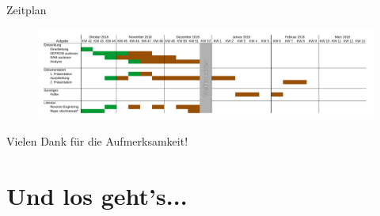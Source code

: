 \documentclass[
  de, %
  inputenc=utf8,
]{tuhhslides}
\begin{document}
\begin{frame}{Zeitplan}
  \begin{figure}
    \begin{center}
      \hspace*{-1cm}
      \includegraphics[scale=0.513]{Material/Zeitplan}
    \end{center}
  \end{figure}
\end{frame}



\backup

\begin{frame}
  \centering \LARGE
  Vielen Dank für die Aufmerksamkeit!
\end{frame}

\section*{Und los geht's...}

\end{document}
